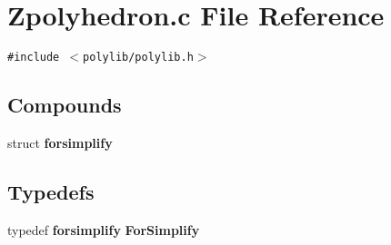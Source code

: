 \section{Zpolyhedron.c File Reference}
\label{Zpolyhedron_8c}
{\tt \#include $<$polylib/polylib.h$>$}\par
\subsection*{Compounds}
\begin{CompactItemize}
\item 
struct {\bf forsimplify}
\end{CompactItemize}
\subsection*{Typedefs}
\begin{CompactItemize}
\item 
typedef {\bf forsimplify} {\bf For\-Simplify}
\end{CompactItemize}

